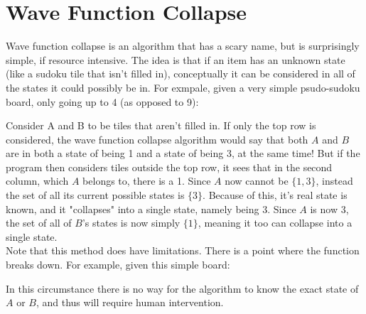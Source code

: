 \documentclass[11pt]{article}
\begin{document}
\section{Wave Function Collapse}
Wave function collapse is an algorithm that has a scary name, but 
is surprisingly simple, if resource intensive. The idea is that if 
an item has an unknown state (like a sudoku tile that isn't filled in), 
conceptually it can be considered in all of the states it could possibly be in.
For exmpale, given a very simple psudo-sudoku board, only going up to 4 (as opposed to 9):\\
\begin{center}
\end{center}
Consider A and B to be tiles that aren't filled in. If only the top row is considered, the wave
function collapse algorithm would say that both $A$ and $B$ are in both a state of being 1 
and a state of being 3, at the same time! But if the program then considers tiles outside the top row,
it sees that in the second column, which $A$ belongs to, there is a 1. Since $A$ now cannot be $\{1, 3\}$, 
instead the set of all its current possible states is $\{3\}$. Because of this, it's real state is known, and it 
"collapses" into a single state, namely being 3. Since $A$ is now 3, the set of all of $B$'s states is now simply
$\{1\}$, meaning it too can collapse into a single state. \\
Note that this method does have limitations. There is a point where the function breaks down. For example, given this simple board:
\begin{center}
\end{center}
In this circumstance there is no way for the algorithm to know the exact state of $A$ or $B$, and thus will require human intervention.
\end{document}
